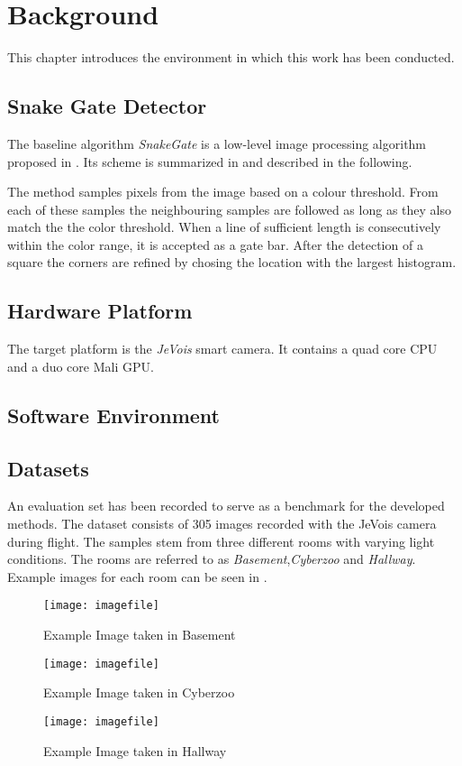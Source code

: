 \chapter{Background}
\label{sec:metrics}

This chapter introduces the environment in which this work has been conducted.

\section{Snake Gate Detector}

The baseline algorithm \textit{SnakeGate} is a low-level image processing algorithm proposed in . Its scheme is summarized in and described in the following.


The method samples pixels from the image based on a colour threshold. From each of these samples the neighbouring samples are followed as long as they also match the the color threshold. When a line of sufficient length is consecutively within the color range, it is accepted as a gate bar. After the detection of a square the corners are refined by chosing the location with the largest histogram.

\section{Hardware Platform}

The target platform is the \textit{JeVois} smart camera. It contains a quad core CPU and a duo core Mali GPU.

\section{Software Environment}

\section{Datasets}

An evaluation set has been recorded to serve as a benchmark for the developed methods. The dataset consists of 305 images recorded with the JeVois camera during flight. The samples stem from three different rooms with varying light conditions. The rooms are referred to as \textit{Basement},\textit{Cyberzoo} and \textit{Hallway}. Example images for each room can be seen in .
\begin{figure}
	\begin{minipage}{0.3\textwidth}
		\texttt{[image: imagefile]}
		\caption{Example Image taken in Basement}
	\end{minipage}
	\begin{minipage}{0.3\textwidth}
	\texttt{[image: imagefile]}
		\caption{Example Image taken in Cyberzoo}
\end{minipage}
	\begin{minipage}{0.3\textwidth}
	\texttt{[image: imagefile]}
	\caption{Example Image taken in Hallway}
\end{minipage}
\end{figure}

